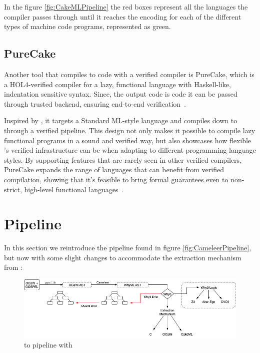 In the figure \ref{fig:CakeMLPipeline} the red boxes represent all the languages the compiler passes through until it reaches the
encoding for each of the different types of machine code programs, represented as green.

\subsection{PureCake}

Another tool that compiles to \cml code with a verified compiler is PureCake, which is a HOL4-verified compiler for a lazy, 
functional language with Haskell-like, indentation sensitive syntax. Since, the output code is \cml code it can be passed 
through \cml trusted backend, ensuring end-to-end verification~\cite{KanabarVAMNPZ23}.

Inspired by \compcert, it targets a Standard ML-style language and compiles down to \cml through a verified pipeline.
This design not only makes it possible to compile lazy functional programs in a sound and verified way, but also showcases 
how flexible \cml's verified infrastructure can be when adapting to different programming language styles. 
By supporting features that are rarely seen in other verified compilers, PureCake expands the range of languages that can 
benefit from verified compilation, showing that it's feasible to bring formal guarantees even to non-strict, high-level 
functional languages~\cite{KanabarVAMNPZ23, KanabarKM24}.

\section{Pipeline}
\label{sec:Pipeline}

In this section we reintroduce the \cameleer pipeline found in figure \ref{fig:CameleerPipeline}, but now with some slight changes
to accommodate the extraction mechanism from \whythree :

\begin{figure}[H]
    \centering
    \includegraphics[width=\linewidth]{images/Cameleer.png}
    \caption{\ocaml to \whyml pipeline with \cameleer}
    \label{fig:Cameleer_pipeline}
\end{figure}

